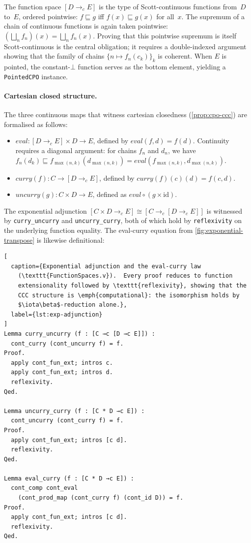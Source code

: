 The function space $[D \to_c E]$ is the type of Scott-continuous
functions from~$D$ to~$E$, ordered pointwise:
$f \sqsubseteq g$ iff $f(x) \sqsubseteq g(x)$ for all~$x$.
The supremum of a chain of continuous functions is again taken pointwise:
$(\bigsqcup_n f_n)(x) = \bigsqcup_n f_n(x)$.  Proving that this
pointwise supremum is itself Scott-continuous is the central obligation;
it requires a double-indexed argument showing that the family of chains
$\{n \mapsto f_n(c_k)\}_{k}$ is coherent.  When $E$ is pointed, the
constant-$\bot$ function serves as the bottom element, yielding a
\texttt{PointedCPO} instance.

\paragraph{Cartesian closed structure.}
The three continuous maps that witness cartesian closedness
(\cref{prop:cpo-ccc}) are formalised as follows:
\begin{itemize}
  \item $\mathit{eval} : [D \to_c E] \times D \to E$, defined by
    $\mathit{eval}(f, d) = f(d)$.  Continuity requires a diagonal
    argument: for chains $f_n$ and $d_n$, we have
    $f_n(d_k) \sqsubseteq f_{\max(n,k)}(d_{\max(n,k)}) = \mathit{eval}(f_{\max(n,k)}, d_{\max(n,k)})$.
  \item $\mathit{curry}(f) : C \to [D \to_c E]$, defined by
    $\mathit{curry}(f)(c)(d) = f(c, d)$.
  \item $\mathit{uncurry}(g) : C \times D \to E$, defined as
    $\mathit{eval} \circ (g \times \mathrm{id})$.
\end{itemize}
The exponential adjunction
$[C \times D \to_c E] \cong [C \to_c [D \to_c E]]$
is witnessed by \texttt{curry\_uncurry} and \texttt{uncurry\_curry},
both of which hold by \texttt{reflexivity} on the underlying function
equality.  The eval-curry equation from
\cref{fig:exponential-transpose} is likewise definitional:

\begin{lstlisting}[
  caption={Exponential adjunction and the eval-curry law
    (\texttt{FunctionSpaces.v}).  Every proof reduces to function
    extensionality followed by \texttt{reflexivity}, showing that the
    CCC structure is \emph{computational}: the isomorphism holds by
    $\iota\beta$-reduction alone.},
  label={lst:exp-adjunction}
]
Lemma curry_uncurry (f : [C →c [D →c E]]) :
  cont_curry (cont_uncurry f) = f.
Proof.
  apply cont_fun_ext; intros c.
  apply cont_fun_ext; intros d.
  reflexivity.
Qed.

Lemma uncurry_curry (f : [C * D →c E]) :
  cont_uncurry (cont_curry f) = f.
Proof.
  apply cont_fun_ext; intros [c d].
  reflexivity.
Qed.

Lemma eval_curry (f : [C * D →c E]) :
  cont_comp cont_eval
    (cont_prod_map (cont_curry f) (cont_id D)) = f.
Proof.
  apply cont_fun_ext; intros [c d].
  reflexivity.
Qed.
\end{lstlisting}

